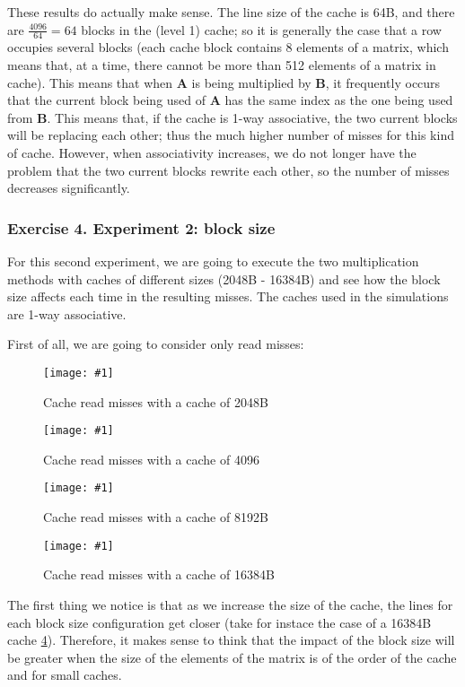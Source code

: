 \documentclass{article}
\newcommand{\myFigure}[4]{%
    \begin{figure}[!ht]
        \texttt{[image: \#1]}
        \centering
        \caption{#2}
        \label{#3}
    \end{figure}
}
\begin{document}
These results do actually make sense. The line size of the cache is 64B, and there are $\frac{4096}{64}=64$ blocks in the 
(level 1) cache; so it is generally the case that a row occupies several blocks (each cache block contains 8 elements of a matrix, which means that, at a time, there cannot be more than 512 elements of a matrix in cache). This means that when $\mathbf{A}$ is being multiplied by $\mathbf{B}$, it frequently occurs that the current block being used of $\mathbf{A}$ has the same index as the one being used from $\mathbf{B}$. This means that, if the cache is 1-way associative, the two current blocks will be replacing each other; thus the much higher number of misses for this kind of cache. However, when associativity increases, we do not longer have the problem that the two current blocks rewrite each other, so the number of misses decreases significantly.


\pagebreak

\subsubsection*{Exercise 4. Experiment 2: block size}


For this second experiment, we are going to execute the two multiplication methods with caches of different sizes (2048B - 16384B) and see how the block size affects each time in the resulting misses. The caches used in the simulations are 1-way associative.

First of all, we are going to consider only read misses:


\myFigure{../material_P3/protect_out4/BlockSize_2048/cache_lectura.png}{Cache read misses with a cache of 2048B}{block_2048_lec}{0.55}


\myFigure{../material_P3/protect_out4/BlockSize_4096/cache_lectura.png}{Cache read misses with a cache of 4096}{block_4096_lec}{0.55}

\myFigure{../material_P3/protect_out4/BlockSize_8192/cache_lectura.png}{Cache read misses with a cache of 8192B}{block_8192B_lec}{0.55}

\myFigure{../material_P3/protect_out4/BlockSize_16384/cache_lectura.png}{Cache read misses with a cache of 16384B}{block_16384B_lec}{0.55}

\pagebreak 
The first thing we notice is that as we increase the size of the cache, the lines for each block size configuration get closer (take for instace the case of a 16384B cache \ref{block_16384B_lec}).  Therefore, it makes sense to think that the impact of the block size will be greater when the size of the elements of the matrix is of the order of the cache and for small caches.
\end{document}
